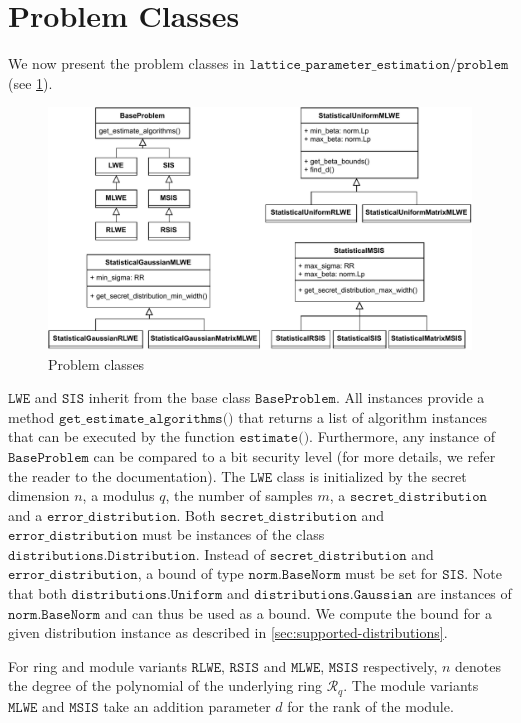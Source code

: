 \section{Problem Classes}\label{sec:problem-classes}
We now present the problem classes in $\texttt{lattice\_parameter\_estimation/problem}$ (see \cref{fig:problem-classes}).
\begin{figure}[h]
    \centering
    \includegraphics[width=1\textwidth]{graphics/problem_classes.pdf}
    \caption{Problem classes}\label{fig:problem-classes}
\end{figure}
$\texttt{LWE}$ and $\texttt{SIS}$ inherit from the base class $\texttt{BaseProblem}$. All instances provide a method $\texttt{get\_estimate\_algorithms()}$ that returns a list of algorithm instances that can be executed by the function $\texttt{estimate()}$. Furthermore, any instance of $\texttt{BaseProblem}$ can be compared to a bit security level (for more details, we refer the reader to the documentation). The $\texttt{LWE}$ class is initialized by the secret dimension $n$, a modulus $q$, the number of samples $m$, a $\texttt{secret\_distribution}$ and a $\texttt{error\_distribution}$. Both $\texttt{secret\_distribution}$ and $\texttt{error\_distribution}$ must be instances of the class $\texttt{distributions.Distribution}$. Instead of $\texttt{secret\_distribution}$ and $\texttt{error\_distribution}$, a bound of type $\texttt{norm.BaseNorm}$ must be set for $\texttt{SIS}$. Note that both $\texttt{distributions.Uniform}$ and $\texttt{distributions.Gaussian}$ are instances of $\texttt{norm.BaseNorm}$ and can thus be used as a bound. We compute the bound for a given distribution instance as described in \cref{sec:supported-distributions}.

For ring and module variants $\texttt{RLWE}$, $\texttt{RSIS}$ and $\texttt{MLWE}$, $\texttt{MSIS}$ respectively, $n$ denotes the degree of the polynomial of the underlying ring $\mathcal{R}_q$. The module variants $\texttt{MLWE}$ and $\texttt{MSIS}$ take an addition parameter $d$ for the rank of the module.

